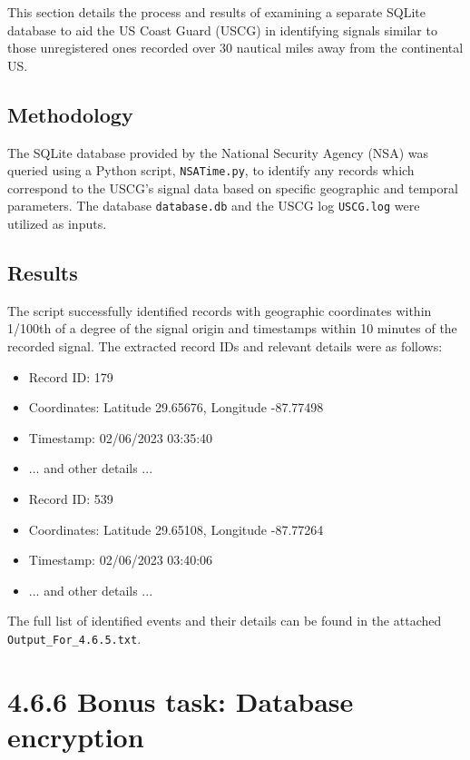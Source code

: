 \documentclass{article}
\begin{document}
This section details the process and results of examining a separate SQLite database to aid the US Coast Guard (USCG) in identifying signals similar to those unregistered ones recorded over 30 nautical miles away from the continental US.

\subsection*{Methodology}
The SQLite database provided by the National Security Agency (NSA) was queried using a Python script, \texttt{NSATime.py}, to identify any records which correspond to the USCG's signal data based on specific geographic and temporal parameters. The database \texttt{database.db} and the USCG log \texttt{USCG.log} were utilized as inputs.

\subsection*{Results}
The script successfully identified records with geographic coordinates within 1/100th of a degree of the signal origin and timestamps within 10 minutes of the recorded signal. The extracted record IDs and relevant details were as follows:

\begin{itemize}
    \item Record ID: 179
    \item Coordinates: Latitude 29.65676, Longitude -87.77498
    \item Timestamp: 02/06/2023 03:35:40
    \item ... and other details ...
\end{itemize}

\begin{itemize}
    \item Record ID: 539
    \item Coordinates: Latitude 29.65108, Longitude -87.77264
    \item Timestamp: 02/06/2023 03:40:06
    \item ... and other details ...
\end{itemize}

The full list of identified events and their details can be found in the attached \texttt{Output\_For\_4.6.5.txt}.

\section*{4.6.6 Bonus task: Database encryption}
\end{document}
